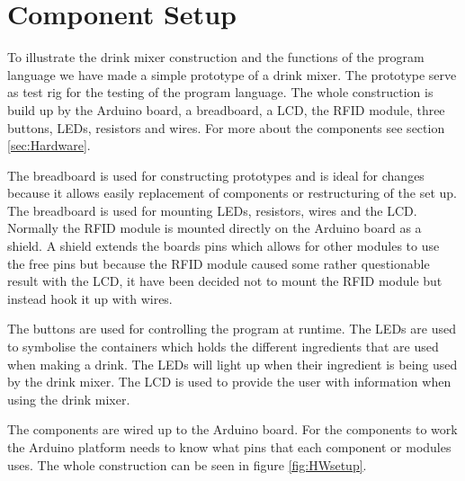 \section{Component Setup}
To illustrate the drink mixer construction and the functions of the program language we have made a simple prototype of a drink mixer. The prototype serve as test rig for the testing of the program language. The whole construction is build up by the Arduino board, a breadboard, a LCD, the RFID module, three buttons, LEDs, resistors and wires. For more about the components see section \ref{sec:Hardware}.

The breadboard is used for constructing prototypes and is ideal for changes because it allows easily replacement of components or restructuring of the set up. The breadboard is used for mounting LEDs, resistors, wires and the LCD.
Normally the RFID module is mounted directly on the Arduino board as a shield. A shield extends the boards pins which allows for other modules to use the free pins but because the RFID module caused some rather questionable result with the LCD, it have been decided not to mount the RFID module but instead hook it up with wires.

The buttons are used for controlling the program at runtime. The LEDs are used to symbolise the containers which holds the different ingredients that are used when making a drink. The LEDs will light up when their ingredient is being used by the drink mixer. The LCD is used to provide the user with information when using the drink mixer.


The components are wired up to the Arduino board. For the components to work the Arduino platform needs to know what pins that each component or modules uses. The whole construction can be seen in figure \ref{fig:HWsetup}.